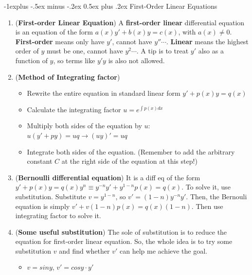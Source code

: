 \documentclass[10pt, landscape]{article}
\makeatletter
\renewcommand{\subsection}{\@startsection{subsection}{2}{0mm}%
                                {-1explus -.5ex minus -.2ex}%
                                {0.5ex plus .2ex}%
                                {\normalfont\normalsize\bfseries}}
\makeatother
\begin{document}
\begin{multicols}{4}
\subsection{First-Order Linear Equations}
\begin{enumerate}
    \item (\textbf{First-order Linear Equation}) A \textbf{first-order linear} differential equation is an equation of the form $a(x)y'+b(x)y=c(x)$, with $a(x)\neq 0$. \textbf{First-order} means only have $y'$, cannot have $y'' \cdots$. \textbf{Linear} means the highest order of $y$ must be one, cannot have $y^2 \cdots$. A tip is to treat $y'$ also as a function of $y$, so terms like $y'y$ is also not allowed.
    \item (\textbf{Method of Integrating factor})
    \begin{itemize}
        \item Rewrite the entire equation in standard linear form $y'+p(x)y=q(x)$
        \item Calculate the integrating factor $u=e^{\int p(x)dx}$
        \item Multiply both sides of the equation by $u$: $u(y'+py)=uq\rightarrow (uy)'=uq$
        \item Integrate both sides of the equation. (Remember to add the arbitrary constant $C$ at the right side of the equation at this step!)
    \end{itemize}
    \item (\textbf{Bernoulli differential equation}) It is a diff eq of the form $y'+p(x)y=q(x)y^n\equiv y^{-n}y'+y^{1-n}p(x)=q(x)$. To solve it, use substitution. Substitute $v=y^{1-n}$, so $v'=(1-n)y^{-n}y'$. Then, the Bernouli equation is simply $v'+v(1-n)p(x)=q(x)(1-n)$. Then use integrating factor to solve it.
    \item (\textbf{Some useful substitution}) The sole of substitution is to reduce the equation for first-order linear equation. So, the whole idea is to try some substitution $v$ and find whether $v'$ can help me achieve the goal.
    \begin{itemize}
        \item $v=siny$, $v'=cosy\cdot y'$
    \end{itemize}
\end{enumerate}

\end{multicols}
\end{document}
